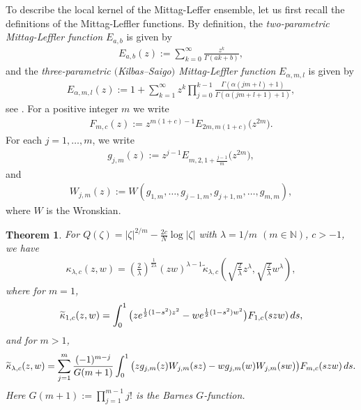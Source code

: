 \documentclass[11pt]{article}
\numberwithin{equation}{section}
\numberwithin{equation}{section}
\newtheorem{Theorem}{Theorem}[section]
\newcommand{\1}{\chi}
\begin{document}
To describe the local kernel of the Mittag-Leffer ensemble, let us first recall the definitions of the Mittag-Leffler functions. By definition, the \emph{two-parametric Mittag-Leffler function} $E_{a,b}$ is given by
\begin{gather} \label{ML function}
	E_{a,b}(z):=\sum_{k=0}^{\infty} \frac{z^k}{\Gamma(ak+b)},
\end{gather}
and the \emph{three-parametric $($Kilbas--Saigo$)$ Mittag-Leffler function} $E_{\alpha,m,l}$ is given by
\begin{gather} \label{ML3}
	E_{\alpha,m,l}(z):=1+\sum_{k=1}^\infty z^k \prod_{j=0}^{k-1} \frac{ \Gamma(\alpha(jm+l)+1) }{ \Gamma(\alpha(jm+l+1)+1) },
\end{gather}
see \cite[Chapters~4 and~5]{gorenflo2014mittag}.
For a positive integer $m$ we write
\begin{gather}\label{F integer}
	F_{m,c}(z):=z^{m(1+c)-1} E_{2m,m(1+c)}\big(z^{2m}\big).
\end{gather}
For each $j =1,\dots,m$, we write
\begin{gather} \label{m indep sol}
g_{j,m}(z):=z^{j-1} E_{m,2,1+\frac{j-1}{m}}\big(z^{2m}\big),
\end{gather}
and
\begin{gather} \label{W_j(z)}
W_{j,m}(z):=W( g_{1,m},\dots, g_{j-1,m}, g_{j+1,m}, \dots, g_{m,m} ),
\end{gather}
where $W$ is the Wronskian.

\begin{Theorem} \label{Thm_ML integer}
	For $Q(\zeta)=|\zeta|^{2/m}-\frac{2c}{N} \log|\zeta|$ with $\lambda=1/m$ $(m\in \mathbb{N})$, $c>-1$, we have
	\begin{gather*}
		\kappa_{\lambda,c}(z,w)=\left( \frac{2}{\lambda} \right)^{ \frac{1}{2\lambda} } (zw)^{\lambda-1} \widetilde{\kappa}_{\lambda,c} \left( \sqrt{ \frac{2}{\lambda} } z^\lambda, \sqrt{ \frac{2}{\lambda} } w^\lambda \right),
	\end{gather*}
	where for $m=1$,
	\begin{gather*}
	\widetilde{\kappa}_{1,c}(z,w)= \int_0^1 \big(z {\rm e}^{ \frac12 (1-s^2)z^2 } -w {\rm e}^{ \frac12 (1-s^2)w^2 }\big)F_{1,c}(szw)\,{\rm d}s,
	\end{gather*}
	and for $m>1$,
	\begin{gather*}
	\widetilde{\kappa}_{\lambda,c}(z,w)= \sum_{j=1}^{m} \frac{(-1)^{m-j}}{G(m+1)} \int_0^1 \big( z g_{j,m}(z)W_{j,m}(sz)-w g_{j,m}(w)W_{j,m}(sw)\big)F_{m,c}(szw)\,{\rm d}s.
	\end{gather*}
	Here $G(m+1):=\prod_{j=1}^{m-1} j!$ is the Barnes $G$-function.
\end{Theorem}
\end{document}
